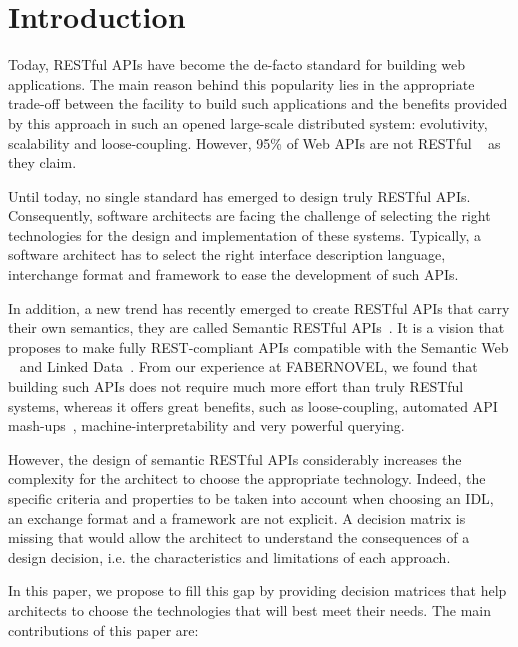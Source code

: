 \section{Introduction}

Today, RESTful APIs \cite{FieldingThesis} have become the de-facto standard for building web applications. The main reason behind this popularity lies in the appropriate trade-off between the facility to build such applications and the benefits provided by this approach in such an opened large-scale distributed system: evolutivity, scalability and loose-coupling. However, 95\% of Web APIs are not RESTful ~\cite{10.1007/978-3-319-38791-8_2} as they claim.

Until today, no single standard has emerged to design truly RESTful APIs. Consequently, software architects are facing the challenge of selecting the right technologies for the design and implementation of these systems. Typically, a software architect has to select the right interface description language, interchange format and framework to ease the development of such APIs.

In addition, a new trend has recently emerged to create RESTful APIs that carry their own semantics, they are called Semantic RESTful APIs~\cite{7195633}. It is a vision that proposes to make fully REST-compliant APIs compatible with the Semantic Web ~\cite{TheSemanticWeb} and Linked Data~\cite{LinkedDataPrinciples}. From our experience at FABERNOVEL, we found that building such APIs does not require much more effort than truly RESTful systems, whereas it offers great benefits, such as loose-coupling, automated API mash-ups~\cite{benslimane2008services}, machine-interpretability and very powerful querying. 

However, the design of semantic RESTful APIs considerably increases the complexity for the architect to choose the appropriate technology. Indeed, the specific criteria and properties to be taken into account when choosing an IDL, an exchange format and a framework are not explicit. A decision matrix is missing that would allow the architect to understand the consequences of a design decision, i.e. the characteristics and limitations of each approach.
 
In this paper, we propose to fill this gap by providing decision matrices that help architects to choose the technologies that will best meet their needs. The main contributions of this paper are:

